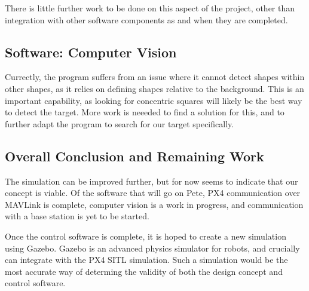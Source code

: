 \documentclass[11pt]{article}
\begin{document}
There is little further work to be done on this aspect of the project, other than integration with other software components as and when they are completed.

\subsection{Software: Computer Vision}
Currectly, the program suffers from an issue where it cannot detect shapes within other shapes, as it relies on defining shapes relative to the background. This is an important capability, as looking for concentric squares will likely be the best way to detect the target. More work is neeeded to find a solution for this, and to further adapt the program to search for our target specifically.

\subsection{Overall Conclusion and Remaining Work}
The simulation can be improved further, but for now seems to indicate that our concept is viable. Of the software that will go on Pete, PX4 communication over MAVLink is complete, computer vision is a work in progress, and communication with a base station is yet to be started.

Once the control software is complete, it is hoped to create a new simulation using Gazebo. Gazebo is an advanced physics simulator for robots, and crucially can integrate with the PX4 SITL simulation. Such a simulation would be the most accurate way of determing the validity of both the design concept and control software.
\end{document}
